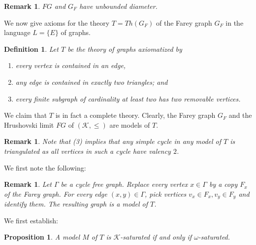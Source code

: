 \documentclass{amsart}
\newcommand{\G}{\Gamma}
\newcommand{\K}{\mathcal{K}}
\newtheorem{definition}[defi]{Definition}
\newtheorem{proposition}[defi]{Proposition}
\newtheorem{remark}[defi]{Remark}
\begin{document}
\begin{remark}
$FG$ and $G_F$ have unbounded diameter.
\end{remark}

We now give axioms for the theory $T=Th(G_F)$ of the Farey graph $G_F$ in the language $L = \{ E \} $ of graphs.

\begin{definition}
    Let $T$ be the theory of graphs axiomatized by 
\begin{enumerate}
   \item every vertex is contained in an edge,
    \item any edge is contained in exactly two triangles; and
    \item every finite subgraph of cardinality at least two has two removable vertices.
\end{enumerate}
\end{definition}
We claim that $T$ is in fact a complete theory.
Clearly, the Farey graph $G_F$ and  the Hrushovski limit $FG$ of $(\K,\leq)$ are models of $T$. 

\begin{remark}\label{rem:triangulated}
Note that (3) implies that any simple cycle in any model of $T$ is triangulated as all vertices in such a cycle have valency $2$.
\end{remark}

We first note the following:

\begin{remark}\label{rem: tree of Fareys}
Let $\G$ be a cycle free graph. Replace every vertex $x\in\G$ by a copy $F_x$ of the Farey graph. For every edge $(x,y)\in \G$, pick vertices $v_x\in F_x, v_y\in F_y$ and identify them. The resulting graph is a model of $T$. 
\end{remark}


We first establish:
\begin{proposition}\label{prop:K-saturated}
    A model  $M$ of $T$ is $\K$-saturated if and only if $\omega$-saturated.
\end{proposition}
\end{document}
